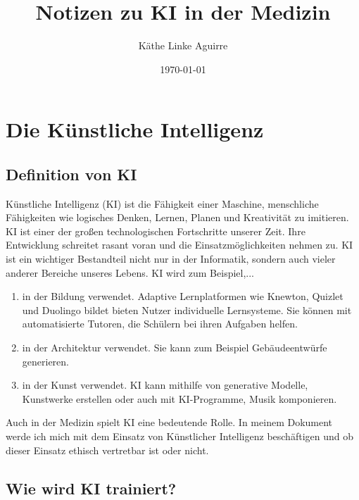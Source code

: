 \documentclass{article}
\title{Notizen zu KI in der Medizin}
\author{Käthe Linke Aguirre}
\date{\today}
\begin{document}
\maketitle


    \tableofcontents

\newpage

\section{Die Künstliche Intelligenz}


\subsection{Definition von KI}
  
Künstliche Intelligenz (KI) ist die Fähigkeit einer Maschine, menschliche Fähigkeiten
wie logisches Denken, Lernen, Planen und Kreativität zu imitieren. KI ist einer der 
großen technologischen Fortschritte unserer Zeit. Ihre Entwicklung schreitet 
rasant voran und die Einsatzmöglichkeiten nehmen zu. KI ist ein wichtiger Bestandteil nicht nur in der Informatik,
sondern auch vieler anderer Bereiche unseres Lebens. 
\newline
KI wird zum Beispiel,... 
\begin{enumerate}
    \item in der Bildung verwendet. Adaptive Lernplatformen wie Knewton, Quizlet und Duolingo bildet bieten Nutzer individuelle Lernsysteme. Sie können mit automatisierte Tutoren, die Schülern bei ihren Aufgaben helfen.
    \item in der Architektur verwendet. Sie kann zum Beispiel Gebäudeentwürfe generieren.
    \item in der Kunst verwendet. KI kann mithilfe von generative Modelle, Kunstwerke erstellen oder auch mit KI-Programme, Musik komponieren.
\end{enumerate}

Auch in der Medizin spielt KI eine bedeutende Rolle. In meinem Dokument werde ich mich
mit dem Einsatz von Künstlicher Intelligenz beschäftigen und ob dieser Einsatz
ethisch vertretbar ist oder nicht. 

\subsection {Wie wird KI trainiert?}
\end{document}
